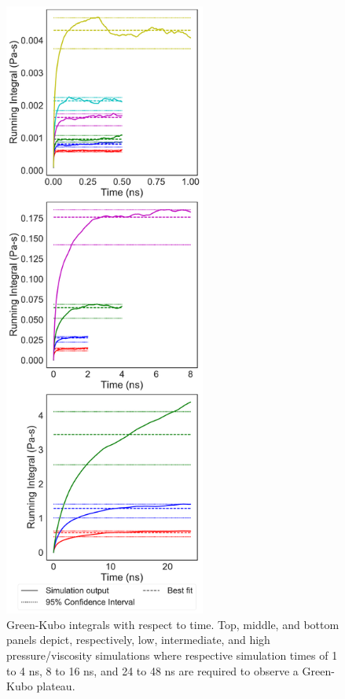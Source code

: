 \documentclass[preprint,review,11pt]{elsarticle}
\begin{document}
	\begin{figure}[htb!]
		\centering
				\includegraphics[width=2.6in]{GreenKubo_integrals.pdf}
		\caption{Green-Kubo integrals with respect to time. Top, middle, and bottom panels depict, respectively, low, intermediate, and high pressure/viscosity simulations where respective simulation times of 1 to 4 ns, 8 to 16 ns, and 24 to 48 ns are required to observe a Green-Kubo plateau.}
		\label{fig:running_integrals}
	\end{figure}

		
%		
%	
%	
%	
	
\end{document}
